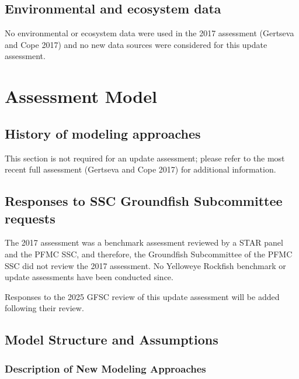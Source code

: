 \documentclass[
]{scrartcl}
\begin{document}
\subsection{Environmental and ecosystem
data}\label{environmental-and-ecosystem-data}

No environmental or ecosystem data were used in the 2017 assessment
(Gertseva and Cope 2017) and no new data sources were considered for
this update assessment.

\newpage{}

\section{Assessment Model}\label{assessment-model}

\subsection{History of modeling
approaches}\label{history-of-modeling-approaches}

This section is not required for an update assessment; please refer to
the most recent full assessment (Gertseva and Cope 2017) for additional
information.

\subsection{Responses to SSC Groundfish Subcommittee
requests}\label{responses-to-ssc-groundfish-subcommittee-requests}

The 2017 assessment was a benchmark assessment reviewed by a STAR panel
and the PFMC SSC, and therefore, the Groundfish Subcommittee of the PFMC
SSC did not review the 2017 assessment. No Yelloweye Rockfish benchmark
or update assessments have been conducted since.

Responses to the 2025 GFSC review of this update assessment will be
added following their review.

\subsection{Model Structure and Assumptions}\label{sec-bridge}

\subsubsection{Description of New Modeling
Approaches}\label{description-of-new-modeling-approaches}
\end{document}
